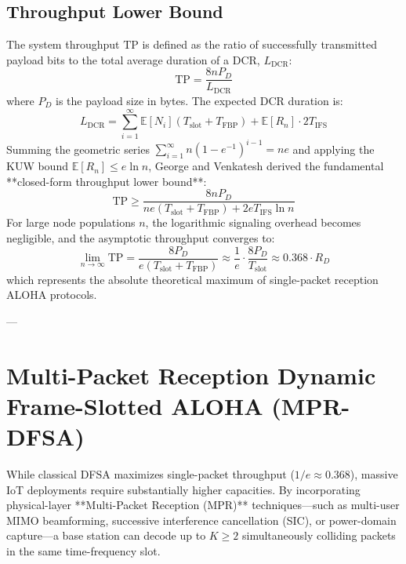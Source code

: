 \subsection{Throughput Lower Bound}
The system throughput $\mathrm{TP}$ is defined as the ratio of successfully transmitted payload bits to the total average duration of a DCR, $L_{\mathrm{DCR}}$:
\begin{equation}
    \mathrm{TP} = \frac{8 n P_D}{L_{\mathrm{DCR}}}
\end{equation}
where $P_D$ is the payload size in bytes. The expected DCR duration is:
\begin{equation}
    L_{\mathrm{DCR}} = \sum_{i=1}^\infty \mathbb{E}[N_i] (T_{\mathrm{slot}} + T_{\mathrm{FBP}}) + \mathbb{E}[R_n] \cdot 2 T_{\mathrm{IFS}}
\end{equation}
Summing the geometric series $\sum_{i=1}^\infty n(1 - e^{-1})^{i-1} = n e$ and applying the KUW bound $\mathbb{E}[R_n] \le e \ln n$, George and Venkatesh derived the fundamental **closed-form throughput lower bound**:
\begin{equation}
    \label{eq:dfsa_tp_bound}
    \mathrm{TP} \ge \frac{8 n P_D}{n e (T_{\mathrm{slot}} + T_{\mathrm{FBP}}) + 2 e T_{\mathrm{IFS}} \ln n}
\end{equation}
For large node populations $n$, the logarithmic signaling overhead becomes negligible, and the asymptotic throughput converges to:
\begin{equation}
    \lim_{n \to \infty} \mathrm{TP} = \frac{8 P_D}{e (T_{\mathrm{slot}} + T_{\mathrm{FBP}})} \approx \frac{1}{e} \cdot \frac{8 P_D}{T_{\mathrm{slot}}} \approx 0.368 \cdot R_D
\end{equation}
which represents the absolute theoretical maximum of single-packet reception ALOHA protocols.

---

\section{Multi-Packet Reception Dynamic Frame-Slotted ALOHA (MPR-DFSA)}
\label{sec:mpr_dfsa}

While classical DFSA maximizes single-packet throughput ($1/e \approx 0.368$), massive IoT deployments require substantially higher capacities. By incorporating physical-layer **Multi-Packet Reception (MPR)** techniques—such as multi-user MIMO beamforming, successive interference cancellation (SIC), or power-domain capture—a base station can decode up to $K \ge 2$ simultaneously colliding packets in the same time-frequency slot.

